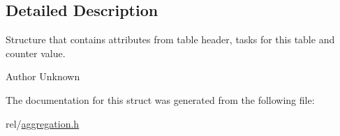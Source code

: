 \subsection{Detailed Description}
Structure that contains attributes from table header, tasks for this table and counter value. 

\begin{DoxyAuthor}{Author}
Unknown 
\end{DoxyAuthor}


The documentation for this struct was generated from the following file\+:\begin{DoxyCompactItemize}
\item 
rel/\hyperlink{aggregation_8h}{aggregation.\+h}\end{DoxyCompactItemize}
